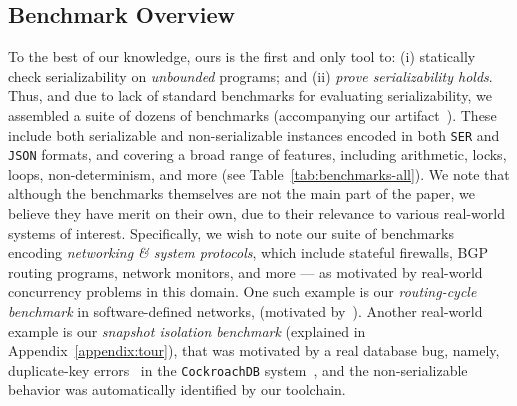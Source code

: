 \subsection{Benchmark Overview} 
\label{subsec:benchmarks}
To the best of our knowledge, ours is the first and only tool to: (i) statically check serializability on \textit{unbounded} programs; and (ii) \textit{prove serializability holds}.
%
Thus, and due to lack of standard benchmarks for evaluating serializability, we 
assembled a suite of dozens of benchmarks (accompanying our artifact~\cite{ArtifactRepository}).
These include both serializable and non-serializable instances encoded in both \texttt{SER} and \texttt{JSON} formats, and covering a broad range of features, including arithmetic, locks, loops, non-determinism, and more (see Table~\ref{tab:benchmarks-all}).
%
We note that although the benchmarks themselves are not the main part of the paper, we believe they have merit on their own, due to their relevance to various real-world systems of interest.
%
Specifically, we wish to note our suite of benchmarks encoding \textit{networking \& system protocols}, which include stateful firewalls, BGP routing programs, network monitors, and more --- 
%
as motivated by real-world concurrency problems in this domain. One such example is our \textit{routing-cycle benchmark} in software-defined networks, (motivated by~\cite{NaGhSa24}). Another real-world example is our \textit{snapshot isolation benchmark} (explained in Appendix~\ref{appendix:tour}), that was motivated by a real database bug, namely, duplicate-key errors~\cite{cockroach-issue-14099} in the \texttt{CockroachDB} system~\cite{cockroachdb-si-docs}, and the non-serializable behavior was automatically identified by our toolchain.
%



